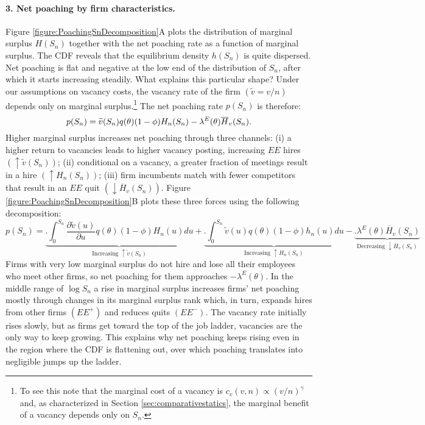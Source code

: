 \paragraph{3. Net poaching by firm characteristics.}
Figure \ref{figure:PoachingSnDecomposition}A plots the distribution of marginal surplus $H(S_n)$ together with the net poaching rate as a function of marginal surplus.
The CDF reveals that the equilibrium density $h(S_n)$ is quite dispersed.
Net poaching is flat and negative at the low end of the distribution of $S_n$, after which it starts increasing steadily.
What explains this particular shape?
Under our assumptions on vacancy costs, the vacancy rate of the firm $(\widetilde{v}=v/n)$ depends only on marginal surplus.\footnote{
    To see this note that the marginal cost of a vacancy is $c_v(v,n) \propto (v/n)^\gamma$ and, as characterized in Section \ref{sec:comparativestatics}, the marginal benefit of a vacancy depends only on $S_n$.
}
The net poaching rate $p(S_n)$ is therefore:
\vspace*{-.3cm}\begin{equation*}
p(S_n) = \widetilde{v}(S_n)q(\theta)(1-\phi)H_n(S_n) - \lambda^E(\theta)\overline{H}_v(S_n).
\vspace*{-.3cm}\end{equation*}
Higher marginal surplus increases net poaching through three channels:
(i) a higher return to vacancies leads to higher vacancy posting, increasing $EE$ hires $(\uparrow \widetilde{v}(S_n))$;
(ii) conditional on a vacancy, a greater fraction of meetings result in a hire $(\uparrow H_n(S_n))$;
(iii) firm incumbents match with fewer competitors that result in an $EE$ quit $(\downarrow \overline{H}_v(S_n))$.
Figure \ref{figure:PoachingSnDecomposition}B plots these three forces using the following decomposition:
\vspace*{-.2cm}\begin{equation*}
p(S_n) =
\underbrace{\bigg.\int^{S_n}_0\frac{\partial \widetilde{v}(u)}{\partial u}q(\theta)(1-\phi)H_n(u)du}_{\text{Increasing $\uparrow \widetilde{v}(S_n)$}}
+ \underbrace{\bigg.\int^{S_n}_0 \widetilde{v}(u)q(\theta)(1-\phi)h_n(u)du}_{\text{Increasing $\uparrow H_n(S_n)$}}
- \underbrace{\bigg.\lambda^E(\theta)\overline{H}_v(S_n)}_{\text{Decreasing $\downarrow \overline{H}_v(S_n)$}}
\end{equation*}
Firms with very low marginal surplus do not hire and lose all their employees who meet other firms, so net poaching for them approaches $-\lambda^{E}(\theta)$.
In the middle range of $\log{S_n}$ a rise in marginal surplus increases firms' net poaching mostly through changes in its marginal surplus rank which, in turn, expands hires from other firms $(EE^{+})$ and reduces quits $(EE^{-})$.
The vacancy rate initially rises slowly, but as firms get toward the top of the job ladder, vacancies are the only way to keep growing.
This explains why net poaching keeps rising even in the region where the CDF is flattening out, over which poaching translates into negligible jumps up the ladder.

